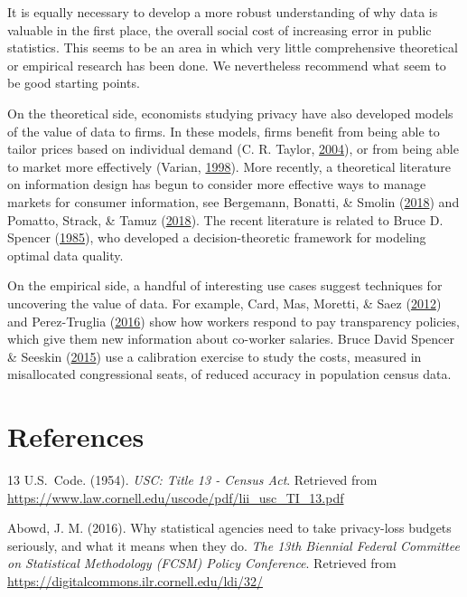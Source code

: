 \documentclass[]{article}
\begin{document}
It is equally necessary to develop a more robust understanding of why
data is valuable in the first place, the overall social cost of
increasing error in public statistics. This seems to be an area in which
very little comprehensive theoretical or empirical research has been
done. We nevertheless recommend what seem to be good starting points.

On the theoretical side, economists studying privacy have also developed
models of the value of data to firms. In these models, firms benefit
from being able to tailor prices based on individual demand (C. R.
Taylor, \protect\hyperlink{ref-Taylor:Consumer:RAND:2004}{2004}), or
from being able to market more effectively (Varian,
\protect\hyperlink{ref-Varian1998}{1998}). More recently, a theoretical
literature on information design has begun to consider more effective
ways to manage markets for consumer information, see Bergemann, Bonatti,
\& Smolin (\protect\hyperlink{ref-10.1257ux2faer.20161079}{2018}) and
Pomatto, Strack, \& Tamuz
(\protect\hyperlink{ref-PomattoTheCostOfInformation2018}{2018}). The
recent literature is related to Bruce D. Spencer
(\protect\hyperlink{ref-Spencer:Optimal:JASA:1985}{1985}), who developed
a decision-theoretic framework for modeling optimal data quality.

On the empirical side, a handful of interesting use cases suggest
techniques for uncovering the value of data. For example, Card, Mas,
Moretti, \& Saez (\protect\hyperlink{ref-CardAER2012}{2012}) and
Perez-Truglia
(\protect\hyperlink{ref-perez-truglia:transparency:SSRN:2016}{2016})
show how workers respond to pay transparency policies, which give them
new information about co-worker salaries. Bruce David Spencer \& Seeskin
(\protect\hyperlink{ref-Seeskin:Spencer:Effects:2015}{2015}) use a
calibration exercise to study the costs, measured in misallocated
congressional seats, of reduced accuracy in population census data.

\section{References}\label{references}

\hypertarget{refs}{}
\hypertarget{ref-title13}{}
13 U.S.~Code. (1954). \emph{USC: Title 13 - Census Act}. Retrieved from
\url{https://www.law.cornell.edu/uscode/pdf/lii_usc_TI_13.pdf}

\hypertarget{ref-abowd:fcsm:2016}{}
Abowd, J. M. (2016). Why statistical agencies need to take privacy-loss
budgets seriously, and what it means when they do. \emph{The 13th
Biennial Federal Committee on Statistical Methodology (FCSM) Policy
Conference}. Retrieved from
\url{https://digitalcommons.ilr.cornell.edu/ldi/32/}
\end{document}
